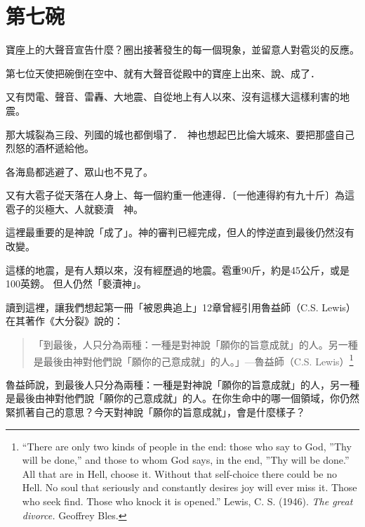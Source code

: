 \section{第七碗}

\begin{ScriptureBox2}{寶座上的大聲音宣告什麼？圈出接著發生的每一個現象，並留意人對雹災的反應。}

\item[16:17] 第七位天使把碗倒在空中、就有大聲音從殿中的寶座上出來、說、成了．

\item[16:18] 又有閃電、聲音、雷轟、大地震、自從地上有人以來、沒有這樣大這樣利害的地震。

\item[16:19] 那大城裂為三段、列國的城也都倒塌了．　神也想起巴比倫大城來、要把那盛自己烈怒的酒杯遞給他。

\item[16:20] 各海島都逃避了、眾山也不見了。

\item[16:21] 又有大雹子從天落在人身上、每一個約重一他連得．〔一他連得約有九十斤〕為這雹子的災極大、人就褻瀆　神。

\end{ScriptureBox2}

這裡最重要的是神說「成了」。神的審判已經完成，但人的悖逆直到最後仍然沒有改變。

這樣的地震，是有人類以來，沒有經歷過的地震。雹重90斤，約是45公斤，或是100英鎊。
但人仍然「褻瀆神」。

讀到這裡，讓我們想起第一冊「被恩典追上」12章曾經引用魯益師（C.S. Lewis）在其著作《大分裂》說的：
\begin{quote}
「到最後，人只分為兩種：一種是對神說「願你的旨意成就」的人。另一種是最後由神對他們說「願你的己意成就」的人。」—魯益師（C.S. Lewis）\footnote{“There are only two kinds of people in the end: those who say to
God, ”Thy will be done,” and those to whom God says, in the end,
”Thy will be done.” All that are in Hell, choose it. Without that
self-choice there could be no Hell. No soul that seriously and
constantly desires joy will ever miss it. Those who seek find. Those
who knock it is opened.” Lewis, C. S. (1946). \textit{The great divorce.}
Geoffrey Bles.}
\end{quote}

\begin{ReaderQuestion}
魯益師說，到最後人只分為兩種：一種是對神說「願你的旨意成就」的人，另一種是最後由神對他們說「願你的己意成就」的人。在你生命中的哪一個領域，你仍然緊抓著自己的意思？今天對神說「願你的旨意成就」，會是什麼樣子？
\end{ReaderQuestion}


